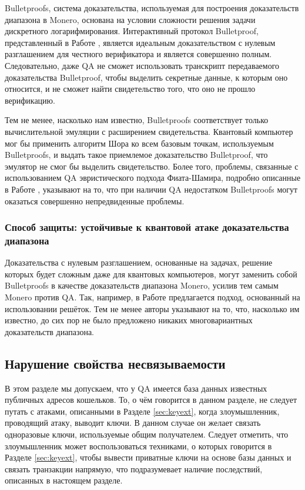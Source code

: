 \documentclass{mrl}
\begin{document}
Bulletproofs, система доказательства, используемая для построения доказательств диапазона в Monero, основана на условии сложности решения задачи дискретного логарифмирования. Интерактивный протокол Bulletproof, представленный в Работе \cite{bunz2018bulletproofs}, является идеальным доказательством с нулевым разглашением для честного верификатора и является совершенно полным. Следовательно, даже QA не сможет использовать транскрипт передаваемого доказательства Bulletproof, чтобы выделить секретные данные, к которым оно относится, и не сможет найти свидетельство того, что оно не прошло верификацию. 

Тем не менее, насколько нам известно, Bulletproofs соответствует только вычислительной эмуляции с расширением свидетельства. Квантовый компьютер мог бы применить алгоритм Шора ко всем базовым точкам, используемым Bulletproofs, и выдать такое приемлемое доказательство Bulletproof, что эмулятор не смог бы выделить свидетельство. Более того, проблемы, связанные с использованием QA эвристического подхода Фиата-Шамира, подробно описанные в Работе \cite{unruh2017post}, указывают на то, что при наличии QA недостатком Bulletproofs могут оказаться совершенно непредвиденные проблемы.

\subsubsection{Способ защиты: устойчивые к квантовой атаке доказательства диапазона} 

Доказательства с нулевым разглашением, основанные на задачах, решение которых будет сложным даже для квантовых компьютеров, могут заменить собой Bulletproofs в качестве доказательств диапазона Monero, усилив тем самым Monero против QA. Так, например, в Работе \cite{yang2019efficient} предлагается подход, основанный на использовании решёток. Тем не менее авторы указывают на то, что, насколько им известно, до сих пор не было предложено никаких многовариантных доказательств диапазона.

\subsection{Нарушение свойства несвязываемости}

В этом разделе мы допускаем, что у QA имеется база данных известных публичных адресов кошельков. То, о чём говорится в данном разделе, не следует путать с атаками, описанными в Разделе \ref{sec:keyext}, когда злоумышленник, проводящий атаку, выводит ключи. В данном случае он желает связать одноразовые ключи, используемые общим получателем. Следует отметить, что злоумышленник может воспользоваться техниками, о которых говорится в Разделе \ref{sec:keyext}, чтобы вывести приватные ключи на основе базы данных и связать транзакции напрямую, что подразумевает наличие последствий, описанных в настоящем разделе.
\end{document}
